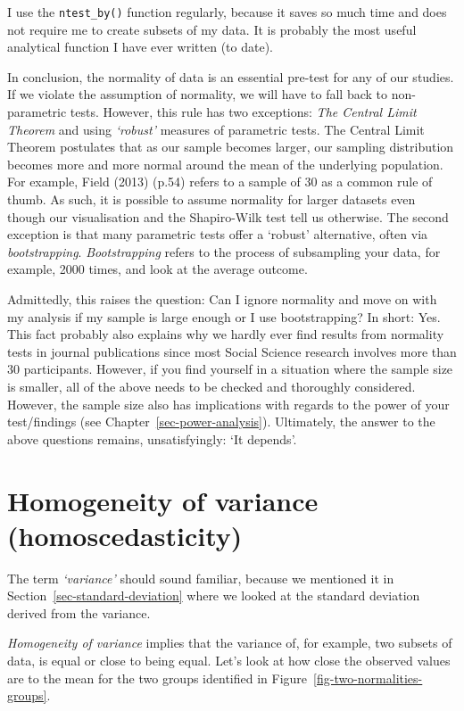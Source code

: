 \documentclass[
  letterpaper,
  DIV=11,
  numbers=noendperiod]{scrreprt}
\begin{document}
I use the \texttt{ntest\_by()} function regularly, because it saves so
much time and does not require me to create subsets of my data. It is
probably the most useful analytical function I have ever written (to
date).

In conclusion, the normality of data is an essential pre-test for any of
our studies. If we violate the assumption of normality, we will have to
fall back to non-parametric tests. However, this rule has two
exceptions: \emph{The Central Limit Theorem} and using \emph{`robust'}
measures of parametric tests. The Central Limit Theorem postulates that
as our sample becomes larger, our sampling distribution becomes more and
more normal around the mean of the underlying population. For example,
Field (2013) (p.54) refers to a sample of 30 as a common rule of thumb.
As such, it is possible to assume normality for larger datasets even
though our visualisation and the Shapiro-Wilk test tell us otherwise.
The second exception is that many parametric tests offer a `robust'
alternative, often via \emph{bootstrapping}. \emph{Bootstrapping} refers
to the process of subsampling your data, for example, 2000 times, and
look at the average outcome.

Admittedly, this raises the question: Can I ignore normality and move on
with my analysis if my sample is large enough or I use bootstrapping? In
short: Yes. This fact probably also explains why we hardly ever find
results from normality tests in journal publications since most Social
Science research involves more than 30 participants. However, if you
find yourself in a situation where the sample size is smaller, all of
the above needs to be checked and thoroughly considered. However, the
sample size also has implications with regards to the power of your
test/findings (see Chapter~\ref{sec-power-analysis}). Ultimately, the
answer to the above questions remains, unsatisfyingly: `It depends'.

\section{Homogeneity of variance
(homoscedasticity)}\label{sec-homogeneity-of-variance}

The term \emph{`variance'} should sound familiar, because we mentioned
it in Section~\ref{sec-standard-deviation} where we looked at the
standard deviation derived from the variance.

\emph{Homogeneity of variance} implies that the variance of, for
example, two subsets of data, is equal or close to being equal. Let's
look at how close the observed values are to the mean for the two groups
identified in Figure~\ref{fig-two-normalities-groups}.
\end{document}
